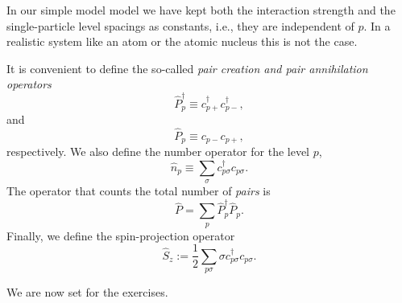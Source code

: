 \documentclass{report}
\begin{document}
In our simple model model we have kept both the interaction strength and the
single-particle level spacings as constants, i.e., they are independent of $p$.  In a realistic system like an
atom or the atomic nucleus this is not the case.

It is convenient to define the so-called  \emph{pair creation and pair annihilation operators}
\[
\hat{P}^{\dag}_p \equiv c^\dag_{p+}c^\dag_{p-},
\]
and
\[
\hat{P}_p \equiv c_{p-}c_{p+},
\] 
respectively. We also define the number operator for the level $p$,
\[ \hat{n}_p \equiv \sum_\sigma c^\dag_{p\sigma} c_{p\sigma}. \]
The operator that counts the total number of \emph{pairs} is
\[ \hat{P} = \sum_{p} \hat{P}^\dag_{p}\hat{P}_p. \]
Finally, we define the spin-projection operator
\[
  \hat{S}_z := \frac{1}{2}\sum_{p\sigma} \sigma
  c^\dag_{p\sigma}c_{p\sigma}.
\]

We are now set for the exercises.
\end{document}
